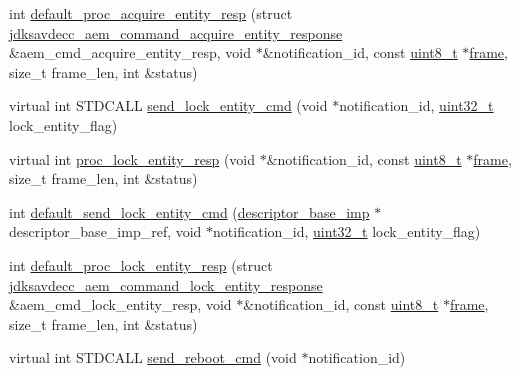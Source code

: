 \begin{DoxyCompactItemize}
\item 
int \hyperlink{classavdecc__lib_1_1descriptor__base__imp_ad248d7d7060e28eb36c8dc37d2653c43}{default\+\_\+proc\+\_\+acquire\+\_\+entity\+\_\+resp} (struct \hyperlink{structjdksavdecc__aem__command__acquire__entity__response}{jdksavdecc\+\_\+aem\+\_\+command\+\_\+acquire\+\_\+entity\+\_\+response} \&aem\+\_\+cmd\+\_\+acquire\+\_\+entity\+\_\+resp, void $\ast$\&notification\+\_\+id, const \hyperlink{stdint_8h_aba7bc1797add20fe3efdf37ced1182c5}{uint8\+\_\+t} $\ast$\hyperlink{gst__avb__playbin_8c_ac8e710e0b5e994c0545d75d69868c6f0}{frame}, size\+\_\+t frame\+\_\+len, int \&status)
\item 
virtual int S\+T\+D\+C\+A\+LL \hyperlink{classavdecc__lib_1_1descriptor__base__imp_a26fd66d8c409502eaa4dba47742ca7fa}{send\+\_\+lock\+\_\+entity\+\_\+cmd} (void $\ast$notification\+\_\+id, \hyperlink{parse_8c_a6eb1e68cc391dd753bc8ce896dbb8315}{uint32\+\_\+t} lock\+\_\+entity\+\_\+flag)
\item 
virtual int \hyperlink{classavdecc__lib_1_1descriptor__base__imp_a6cd2b73ea95b18f07dbdc251140679b0}{proc\+\_\+lock\+\_\+entity\+\_\+resp} (void $\ast$\&notification\+\_\+id, const \hyperlink{stdint_8h_aba7bc1797add20fe3efdf37ced1182c5}{uint8\+\_\+t} $\ast$\hyperlink{gst__avb__playbin_8c_ac8e710e0b5e994c0545d75d69868c6f0}{frame}, size\+\_\+t frame\+\_\+len, int \&status)
\item 
int \hyperlink{classavdecc__lib_1_1descriptor__base__imp_af40ac09b84feb7551bf0389a2a5db4ca}{default\+\_\+send\+\_\+lock\+\_\+entity\+\_\+cmd} (\hyperlink{classavdecc__lib_1_1descriptor__base__imp}{descriptor\+\_\+base\+\_\+imp} $\ast$descriptor\+\_\+base\+\_\+imp\+\_\+ref, void $\ast$notification\+\_\+id, \hyperlink{parse_8c_a6eb1e68cc391dd753bc8ce896dbb8315}{uint32\+\_\+t} lock\+\_\+entity\+\_\+flag)
\item 
int \hyperlink{classavdecc__lib_1_1descriptor__base__imp_a3b3582020613e7f60efe96567679be7f}{default\+\_\+proc\+\_\+lock\+\_\+entity\+\_\+resp} (struct \hyperlink{structjdksavdecc__aem__command__lock__entity__response}{jdksavdecc\+\_\+aem\+\_\+command\+\_\+lock\+\_\+entity\+\_\+response} \&aem\+\_\+cmd\+\_\+lock\+\_\+entity\+\_\+resp, void $\ast$\&notification\+\_\+id, const \hyperlink{stdint_8h_aba7bc1797add20fe3efdf37ced1182c5}{uint8\+\_\+t} $\ast$\hyperlink{gst__avb__playbin_8c_ac8e710e0b5e994c0545d75d69868c6f0}{frame}, size\+\_\+t frame\+\_\+len, int \&status)
\item 
virtual int S\+T\+D\+C\+A\+LL \hyperlink{classavdecc__lib_1_1descriptor__base__imp_a7579db44e8e86da0f8f94aa4680df795}{send\+\_\+reboot\+\_\+cmd} (void $\ast$notification\+\_\+id)

\end{DoxyCompactItemize}
